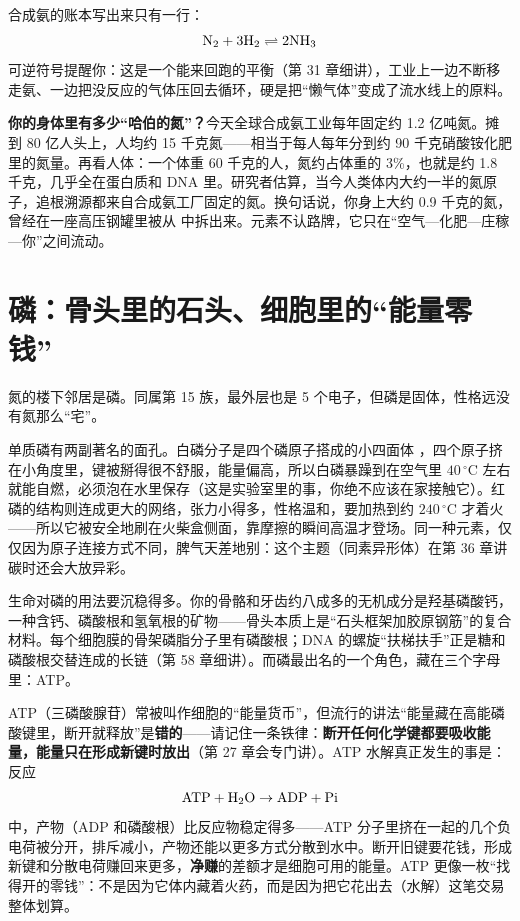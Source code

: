 合成氨的账本写出来只有一行：
\[\mathrm{N_2} + \mathrm{3H_2} \rightleftharpoons \mathrm{2NH_3}\]
可逆符号提醒你：这是一个能来回跑的平衡（第 31 章细讲），工业上一边不断移走氨、一边把没反应的气体压回去循环，硬是把“懒气体”变成了流水线上的原料。

\begin{qiaoliang}
\textbf{你的身体里有多少“哈伯的氮”？}今天全球合成氨工业每年固定约 1.2 亿吨氮。摊到 80 亿人头上，人均约 15 千克氮——相当于每人每年分到约 90 千克硝酸铵化肥里的氮量。再看人体：一个体重 60 千克的人，氮约占体重的 3\%，也就是约 1.8 千克，几乎全在蛋白质和 DNA 里。研究者估算，当今人类体内大约一半的氮原子，追根溯源都来自合成氨工厂固定的氮。换句话说，你身上大约 0.9 千克的氮，曾经在一座高压钢罐里被从  中拆出来。元素不认路牌，它只在“空气—化肥—庄稼—你”之间流动。
\end{qiaoliang}

\section{磷：骨头里的石头、细胞里的“能量零钱”}

氮的楼下邻居是磷。同属第 15 族，最外层也是 5 个电子，但磷是固体，性格远没有氮那么“宅”。

单质磷有两副著名的面孔。白磷分子是四个磷原子搭成的小四面体 ，四个原子挤在小角度里，键被掰得很不舒服，能量偏高，所以白磷暴躁到在空气里 $40\,^{\circ}\mathrm{C}$ 左右就能自燃，必须泡在水里保存（这是实验室里的事，你绝不应该在家接触它）。红磷的结构则连成更大的网络，张力小得多，性格温和，要加热到约 $240\,^{\circ}\mathrm{C}$ 才着火——所以它被安全地刷在火柴盒侧面，靠摩擦的瞬间高温才登场。同一种元素，仅仅因为原子连接方式不同，脾气天差地别：这个主题（同素异形体）在第 36 章讲碳时还会大放异彩。

生命对磷的用法要沉稳得多。你的骨骼和牙齿约八成多的无机成分是羟基磷酸钙，一种含钙、磷酸根和氢氧根的矿物——骨头本质上是“石头框架加胶原钢筋”的复合材料。每个细胞膜的骨架磷脂分子里有磷酸根；DNA 的螺旋“扶梯扶手”正是糖和磷酸根交替连成的长链（第 58 章细讲）。而磷最出名的一个角色，藏在三个字母里：ATP。

ATP（三磷酸腺苷）常被叫作细胞的“能量货币”，但流行的讲法“能量藏在高能磷酸键里，断开就释放”是\textbf{错的}——请记住一条铁律：\textbf{断开任何化学键都要吸收能量，能量只在形成新键时放出}（第 27 章会专门讲）。ATP 水解真正发生的事是：反应
\[\mathrm{ATP} + \mathrm{H_2O} \rightarrow \mathrm{ADP} + \mathrm{Pi}\]
中，产物（ADP 和磷酸根）比反应物稳定得多——ATP 分子里挤在一起的几个负电荷被分开，排斥减小，产物还能以更多方式分散到水中。断开旧键要花钱，形成新键和分散电荷赚回来更多，\textbf{净赚}的差额才是细胞可用的能量。ATP 更像一枚“找得开的零钱”：不是因为它体内藏着火药，而是因为把它花出去（水解）这笔交易整体划算。

